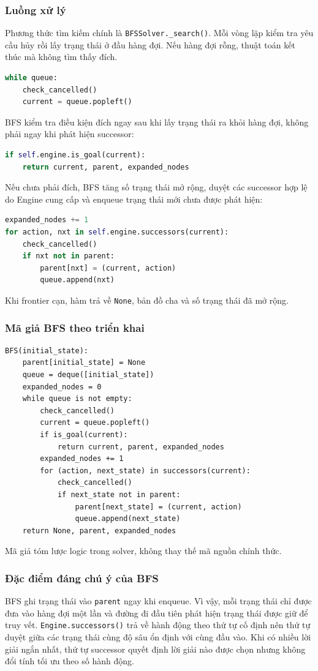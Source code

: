 \subsubsection{Luồng xử lý}
Phương thức tìm kiếm chính là \texttt{BFSSolver.\_search()}. Mỗi vòng lặp kiểm tra yêu cầu hủy rồi lấy trạng thái ở đầu hàng đợi. Nếu hàng đợi rỗng, thuật toán kết thúc mà không tìm thấy đích.
\begin{lstlisting}[language=Python]
while queue:
    check_cancelled()
    current = queue.popleft()
\end{lstlisting}
BFS kiểm tra điều kiện đích ngay sau khi lấy trạng thái ra khỏi hàng đợi, không phải ngay khi phát hiện successor:
\begin{lstlisting}[language=Python]
if self.engine.is_goal(current):
    return current, parent, expanded_nodes
\end{lstlisting}
Nếu chưa phải đích, BFS tăng số trạng thái mở rộng, duyệt các successor hợp lệ do Engine cung cấp và enqueue trạng thái mới chưa được phát hiện:
\begin{lstlisting}[language=Python]
expanded_nodes += 1
for action, nxt in self.engine.successors(current):
    check_cancelled()
    if nxt not in parent:
        parent[nxt] = (current, action)
        queue.append(nxt)
\end{lstlisting}
Khi frontier cạn, hàm trả về \texttt{None}, bản đồ cha và số trạng thái đã mở rộng.

\subsubsection{Mã giả BFS theo triển khai}
\begin{lstlisting}
BFS(initial_state):
    parent[initial_state] = None
    queue = deque([initial_state])
    expanded_nodes = 0
    while queue is not empty:
        check_cancelled()
        current = queue.popleft()
        if is_goal(current):
            return current, parent, expanded_nodes
        expanded_nodes += 1
        for (action, next_state) in successors(current):
            check_cancelled()
            if next_state not in parent:
                parent[next_state] = (current, action)
                queue.append(next_state)
    return None, parent, expanded_nodes
\end{lstlisting}
Mã giả tóm lược logic trong solver, không thay thế mã nguồn chính thức.

\subsubsection{Đặc điểm đáng chú ý của BFS}
BFS ghi trạng thái vào \texttt{parent} ngay khi enqueue. Vì vậy, mỗi trạng thái chỉ được đưa vào hàng đợi một lần và đường đi đầu tiên phát hiện trạng thái được giữ để truy vết. \texttt{Engine.successors()} trả về hành động theo thứ tự cố định nên thứ tự duyệt giữa các trạng thái cùng độ sâu ổn định với cùng đầu vào. Khi có nhiều lời giải ngắn nhất, thứ tự successor quyết định lời giải nào được chọn nhưng không đổi tính tối ưu theo số hành động.


